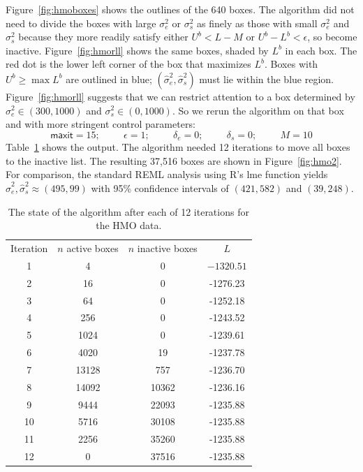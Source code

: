 \documentclass{report}
\newcommand{\textcompute}{\textsf}
\newcommand{\R}{\textcompute{R}\xspace}
\newcommand{\sigssq}{\sigma_s^2}
\newcommand{\sigesq}{\sigma_e^2}
\newcommand{\sshat}{\hat\sigma^2_e,\hat\sigma^2_s}
\newcommand{\maxit}{\textcompute{maxit}}
\begin{document}
Figure~\ref{fig:hmoboxes} shows the outlines of the 640 boxes.  The algorithm did not need to divide the boxes with large $\sigesq$ or $\sigssq$ as finely as those with small $\sigesq$ and $\sigssq$ because they more readily satisfy either $U^b < L-M$ or $U^b - L^b < \epsilon$, so become inactive.  Figure~\ref{fig:hmorll} shows the same boxes, shaded by $L^b$ in each box.  The red dot is the lower left corner of the box that maximizes $L^b$.  Boxes with $U^b \ge \max L^b$ are outlined in blue; $(\sshat)$ must lie within the blue region.  
Figure~\ref{fig:hmorll}  suggests that we can restrict attention to a box determined by $\sigesq\in(300,1000)$ and $\sigssq\in(0,1000)$.  So we rerun the algorithm on that box and with more stringent control parameters:
\begin{equation*}
	\maxit=15; \hspace{1cm} \epsilon=1; \hspace{1cm}
	\delta_e=0; \hspace{1cm} \delta_s=0; \hspace{1cm} M=10
\end{equation*}
Table~\ref{table:hmo_HH11_run2} shows the output.  The algorithm needed 12 iterations to move all boxes to the inactive list.  The resulting 37,516 boxes are shown in Figure~\ref{fig:hmo2}.  For comparison, the standard REML analysis using \R's \textcompute{lme} function yields $\sshat \approx (495, 99)$ with 95\% confidence intervals of $(421, 582)$ and $(39, 248)$.

\begin{table}[h]
\centering
\begin{tabular}{|c|c|c|c|}
\hline
Iteration & $n$ active boxes & $n$ inactive boxes & $L$\\
1 & 4 & 0 & $-1320.51$\\
2 & 16 & 0 & -1276.23\\
3 & 64 & 0 & -1252.18\\
4 & 256 & 0 & -1243.52\\
5 & 1024 & 0 & -1239.61\\
6 & 4020 & 19 & -1237.78\\
7 & 13128 & 757 & -1236.70\\
8 & 14092 & 10362 & -1236.16\\
9 & 9444 & 22093 & -1235.88\\
10 & 5716 & 30108 & -1235.88\\
11 & 2256 & 35260 & -1235.88\\
12 & 0 & 37516 & -1235.88\\
\hline
\end{tabular}
\caption{The state of the algorithm after each of 12 iterations for the HMO data.}
\label{table:hmo_HH11_run2}
\end{table}
\end{document}
